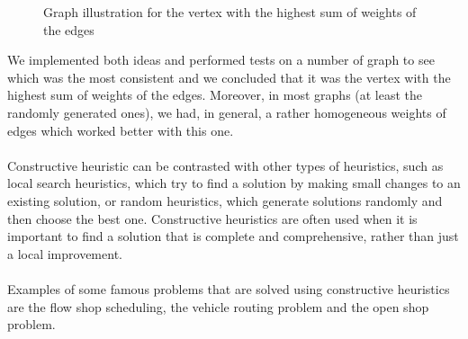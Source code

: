 \begin{minipage}{\linewidth}
\begin{minipage}{0.5\textwidth}
\begin{figure}[H]
                \caption{Graph illustration for the vertex with the highest sum of weights of the edges}
                \label{fig:vertex-best-sum-weight-edge}
            \end{figure}
        \end{minipage}
    \end{minipage}

    \vspace{1\baselineskip}

    We implemented both ideas and performed tests on a number of graph to see which was the most consistent and we concluded that it was the vertex with the highest sum of weights of the edges. Moreover, in most graphs (at least the randomly generated ones), we had, in general, a rather homogeneous weights of edges which worked better with this one.
    \\ \\
    Constructive heuristic can be contrasted with other types of heuristics, such as local search heuristics, which try to find a solution by making small changes to an existing solution, or random heuristics, which generate solutions randomly and then choose the best one. Constructive heuristics are often used when it is important to find a solution that is complete and comprehensive, rather than just a local improvement.
    \\ \\
    Examples of some famous problems that are solved using constructive heuristics are the flow shop scheduling, the vehicle routing problem and the open shop problem.
    
    